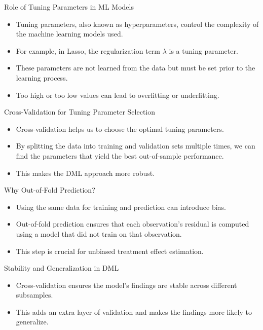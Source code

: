 \documentclass{beamer}
\begin{document}
\begin{frame}{Role of Tuning Parameters in ML Models}
\begin{itemize}
\item Tuning parameters, also known as hyperparameters, control the complexity of the machine learning models used.
\item For example, in Lasso, the regularization term $\lambda$  is a tuning parameter.
\item These parameters are not learned from the data but must be set prior to the learning process.
\item Too high or too low values can lead to overfitting or underfitting.
\end{itemize}
\end{frame}

\begin{frame}{Cross-Validation for Tuning Parameter Selection}
\begin{itemize}
\item Cross-validation helps us to choose the optimal tuning parameters.
\item By splitting the data into training and validation sets multiple times, we can find the parameters that yield the best out-of-sample performance.
\item This makes the DML approach more robust.
\end{itemize}
\end{frame}

\begin{frame}{Why Out-of-Fold Prediction?}
\begin{itemize}
\item Using the same data for training and prediction can introduce bias.
\item Out-of-fold prediction ensures that each observation's residual is computed using a model that did not train on that observation.
\item This step is crucial for unbiased treatment effect estimation.
\end{itemize}
\end{frame}

\begin{frame}{Stability and Generalization in DML}
\begin{itemize}
\item Cross-validation ensures the model's findings are stable across different subsamples.
\item This adds an extra layer of validation and makes the findings more likely to generalize.
\end{itemize}
\end{frame}
\end{document}
